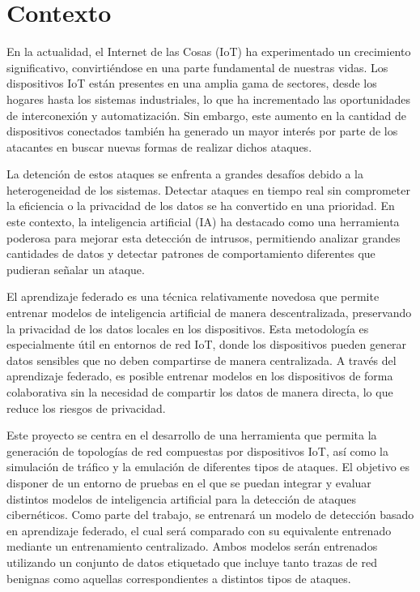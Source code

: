 
\section{Contexto}
En la actualidad, el Internet de las Cosas (IoT) ha experimentado un crecimiento significativo, convirtiéndose en una parte fundamental de nuestras vidas. Los dispositivos IoT están presentes en una amplia gama de sectores, desde los hogares hasta los sistemas industriales, lo que ha incrementado las oportunidades de interconexión y automatización. Sin embargo, este aumento en la cantidad de dispositivos conectados también ha generado un mayor interés por parte de los atacantes en buscar nuevas formas de realizar dichos ataques.

La detención de estos ataques se enfrenta a  grandes desafíos debido a la heterogeneidad de los sistemas. Detectar ataques en tiempo real sin comprometer la eficiencia o la privacidad de los datos se ha convertido en una prioridad. En este contexto, la inteligencia artificial (IA) ha destacado como una herramienta poderosa para mejorar esta detección de intrusos, permitiendo analizar grandes cantidades de datos y detectar patrones de comportamiento diferentes que pudieran señalar un ataque.

El aprendizaje federado es una técnica relativamente novedosa que permite entrenar modelos de inteligencia artificial de manera descentralizada, preservando la privacidad de los datos locales en los dispositivos. Esta metodología es especialmente útil en entornos de red IoT, donde los dispositivos pueden generar datos sensibles que no deben compartirse de manera centralizada. A través del aprendizaje federado, es posible entrenar modelos en los dispositivos de forma colaborativa sin la necesidad de compartir los datos de manera directa, lo que reduce los riesgos de privacidad.

Este proyecto se centra en el desarrollo de una herramienta que permita la generación de topologías de red compuestas por dispositivos IoT, así como la simulación de tráfico y la emulación de diferentes tipos de ataques. El objetivo es disponer de un entorno de pruebas en el que se puedan integrar y evaluar distintos modelos de inteligencia artificial para la detección de ataques cibernéticos. Como parte del trabajo, se entrenará un modelo de detección basado en aprendizaje federado, el cual será comparado con su equivalente entrenado mediante un entrenamiento centralizado. Ambos modelos serán entrenados utilizando un conjunto de datos etiquetado que incluye tanto trazas de red benignas como aquellas correspondientes a distintos tipos de ataques.

